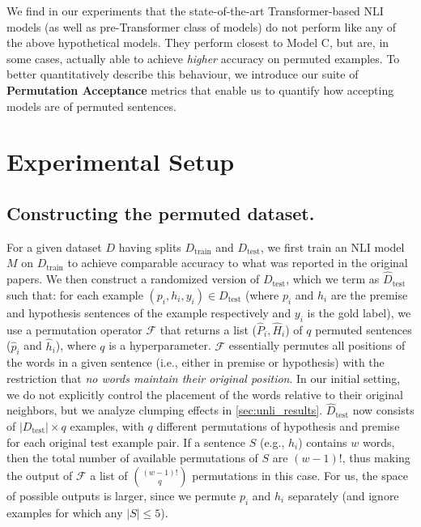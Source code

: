 \documentclass[letterpaper, 12pt]{report}
\newcommand{\PermAcc}{Permutation Acceptance} %
\begin{document}
We find in our experiments that the state-of-the-art Transformer-based NLI models (as well as pre-Transformer class of models) do not perform like any of the above hypothetical models. They perform closest to Model C, but are, in some cases, actually able to achieve \emph{higher} accuracy on permuted examples. To better quantitatively describe this behaviour,
we introduce our suite of \textbf{\PermAcc} metrics that enable us to quantify how accepting models are of permuted sentences.


\section{Experimental Setup}
\label{sec:unli_exp_setup}

\subsection{Constructing the permuted dataset.}

For a given dataset $D$ having splits $D_{\text{train}}$ and $D_{\text{test}}$, we first train an NLI model $M$ on $D_{\text{train}}$ to achieve comparable accuracy to what was reported in the original papers. We then construct a randomized version of $D_{\text{test}}$, which we term as $\hat{D}_{\text{test}}$ such that: for each example $(p_i,h_i,y_i) \in D_{\text{test}}$ (where $p_i$ and $h_i$ are the premise and hypothesis sentences of the example respectively and $y_i$ is the gold label), we use a permutation operator $\mathcal{F}$ that returns a list ($\hat{P}_i, \hat{H}_i$) of $q$ permuted sentences ($\hat{p}_i$ and $\hat{h}_i$), where $q$ is a hyperparameter. $\mathcal{F}$ essentially permutes all positions of the words in a given sentence (i.e., either in premise or hypothesis) with the restriction that \textit{no words maintain their original position}.  In our initial setting, we do not explicitly control the placement of the words relative to their original neighbors, but we analyze clumping effects in \autoref{sec:unli_results}.
$\hat{D}_{\text{test}}$ now consists of $|D_{\text{test}}| \times q$ examples, with $q$ different permutations of hypothesis and premise for each original test example pair. If a sentence $S$ (e.g., $h_i$) contains $w$ words, then the total number of available permutations of $S$ are $(w-1)!$, thus making the output of $\mathcal{F}$ a list of $(w-1)! \choose q$ permutations in this case. For us, the space of possible outputs is larger, since we permute $p_i$ and $h_i$ separately (and ignore examples for which any $|S|\leq5$).
\end{document}
